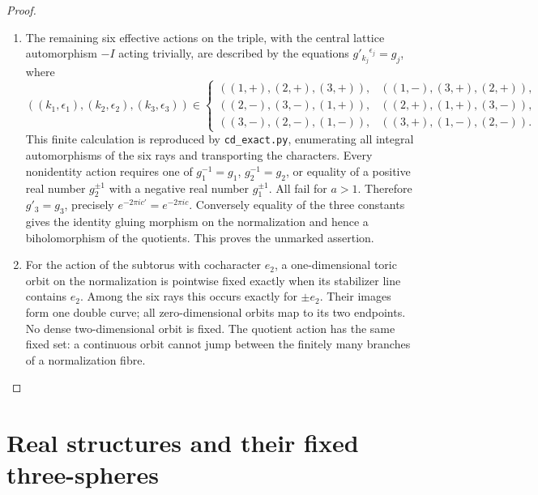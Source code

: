 \begin{proof}
\begin{enumerate}[label=\arabic*.,leftmargin=*]
\item The remaining six effective actions on the triple, with the central
lattice automorphism \(-I\) acting trivially, are described by the equations
\(g'_{k_j}{}^{\epsilon_j}=g_j\), where
\[
 ((k_1,\epsilon_1),(k_2,\epsilon_2),(k_3,\epsilon_3))
 \in\left\{
\begin{array}{lll}
((1,+),(2,+),(3,+)),&((1,-),(3,+),(2,+)),\\
((2,-),(3,-),(1,+)),&((2,+),(1,+),(3,-)),\\
((3,-),(2,-),(1,-)),&((3,+),(1,-),(2,-)).
\end{array}\right.
\]
This finite calculation is reproduced by \texttt{cd\_exact.py}, enumerating
all integral automorphisms of the six rays and transporting the characters.
Every nonidentity action requires one of
\(g_1^{-1}=g_1\), \(g_2^{-1}=g_2\), or equality of a positive real number
\(g_2^{\pm1}\) with a negative real number \(g_1^{\pm1}\).
All fail for \(a>1\). Therefore \(g'_3=g_3\), precisely
\(e^{-2\pi ic'}=e^{-2\pi ic}\). Conversely equality of the three constants
gives the identity gluing morphism on the normalization and hence a
biholomorphism of the quotients. This proves the unmarked assertion.

\item For the action of the subtorus with cocharacter \(e_2\), a one-dimensional
toric orbit on the normalization is pointwise fixed exactly when its
stabilizer line contains \(e_2\). Among the six rays this occurs exactly
for \(\pm e_2\). Their images form one double curve; all zero-dimensional
orbits map to its two endpoints. No dense two-dimensional orbit is fixed.
The quotient action has the same fixed set: a continuous orbit cannot
jump between the finitely many branches of a normalization fibre.
\end{enumerate}
\end{proof}


\section{Real structures and their fixed three-spheres}\label{mapsI:real-forms}

